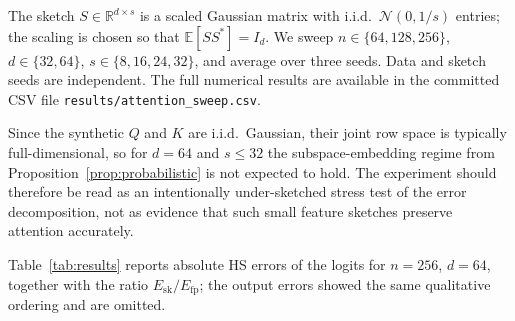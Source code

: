 The sketch $S \in \mathbb{R}^{d \times s}$ is a scaled Gaussian matrix with i.i.d.\ $\mathcal{N}(0, 1/s)$ entries; the scaling is chosen so that $\mathbb{E}[SS^*] = I_d$. We sweep $n \in \{64, 128, 256\}$, $d \in \{32, 64\}$, $s \in \{8, 16, 24, 32\}$, and average over three seeds. Data and sketch seeds are independent. The full numerical results are available in the committed CSV file \texttt{results/attention\_sweep.csv}.

Since the synthetic $Q$ and $K$ are i.i.d.\ Gaussian, their joint row space is typically full-dimensional, so for $d = 64$ and $s \leq 32$ the subspace-embedding regime from Proposition~\ref{prop:probabilistic} is not expected to hold. The experiment should therefore be read as an intentionally under-sketched stress test of the error decomposition, not as evidence that such small feature sketches preserve attention accurately.

Table~\ref{tab:results} reports absolute HS errors of the logits for $n = 256$, $d = 64$, together with the ratio $E_{\mathrm{sk}}/E_{\mathrm{fp}}$; the output errors showed the same qualitative ordering and are omitted.

